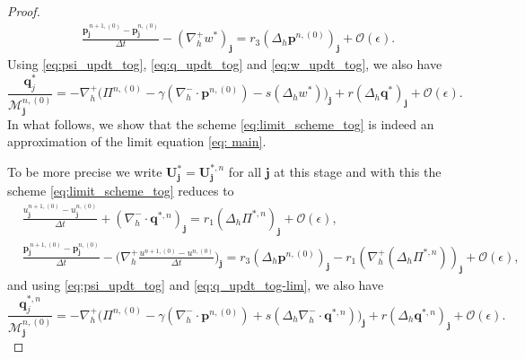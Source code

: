 \documentclass[11pt]{article}
\numberwithin{equation}{section}
\newtheorem{counter example}[theorem]{Counter Example}
\numberwithin{equation}{section}
\numberwithin{equation}{section}
\begin{document}
\begin{proof}
\begin{subequations}
\begin{align}
&\frac{\mathbf{p}_{\mathbf{j}}^{\,n+1,(0)} - \mathbf{p}_{\mathbf{j}}^{n,(0)}}{\Delta t} - (\nabla_h^+ w^{*})_{\mathbf{j}}= r_3(\Delta_h \mathbf{p}^{n,(0)})_{\mathbf{j}}+\mathcal{O}(\epsilon).\label{eq:p_updt_tog}
\end{align}
\end{subequations}
Using \eqref{eq:psi_updt_tog}, \eqref{eq:q_updt_tog} and \eqref{eq:w_updt_tog}, we also have
\begin{equation}
\label{eq:q_updt_tog-lim}
\frac{\mathbf{q}_{j}^{*}}{\mathcal{M}_{\mathbf{j}}^{n,(0)}}= 
-\nabla_h^+ \bigl(\Pi^{n,(0)}-\gamma(\nabla_h^- \cdot \mathbf{p}^{n,(0)})
-s(\Delta_{h}w^{*})\bigr)_{\mathbf{j}}+r(\Delta_{h} \mathbf{q}^{*})_{\mathbf{j}}+\mathcal{O}(\epsilon).
\end{equation}
In what follows, we show that the scheme \eqref{eq:limit_scheme_tog} is indeed an approximation of the limit equation \eqref{eq: main}.

To be more precise we write $\mathbf{U}^*_\mathbf{j}=\mathbf{U}^{*,n}_\mathbf{j}$ for all $\mathbf{j}$ at this stage and with this the scheme \eqref{eq:limit_scheme_tog} reduces to
\begin{subequations}
\label{eq:limit_scheme_tog1}
\begin{align}
&\frac{u_{\mathbf{j}}^{n+1,(0)} - u_{\mathbf{j}}^{n,(0)}}{\Delta t} + (\nabla_h^- \cdot\mathbf{q}^{*,n})_{\mathbf{j}} = r_1(\Delta_{h} \Pi^{*,n})_{\mathbf{j}}+\mathcal{O}(\epsilon),\label{eq:h_updt_tog1}\\
&\frac{\mathbf{p}_{\mathbf{j}}^{\,n+1,(0)} - \mathbf{p}_{\mathbf{j}}^{n,(0)}}{\Delta t} - \bigg(\nabla_h^+ \frac{u^{n+1,(0)} - u^{n,(0)}}{\Delta t}\bigg)_{\mathbf{j}}= r_3(\Delta_h \mathbf{p}^{n,(0)})_{\mathbf{j}}-r_1(\nabla_h^+(\Delta_{h} \Pi^{*,n}))_{\mathbf{j}}+\mathcal{O}(\epsilon),\label{eq:p_updt_tog1}
\end{align}
\end{subequations}
and using \eqref{eq:psi_updt_tog} and \eqref{eq:q_updt_tog-lim}, we also have
\begin{equation}
\label{eq:q_updt_tog-lim1}
\frac{\mathbf{q}_{j}^{{*},n}}{\mathcal{M}_{\mathbf{j}}^{n,(0)}}= 
-\nabla_h^+ \bigl(\Pi^{n,(0)}-\gamma(\nabla_h^- \cdot \mathbf{p}^{n,(0)})
+s(\Delta_{h}\nabla_h^- \cdot \mathbf{q}^{*,n})\bigr)_{\mathbf{j}}+r(\Delta_{h} \mathbf{q}^{*,n})_{\mathbf{j}}+\mathcal{O}(\epsilon).
\end{equation}


\end{proof}
\end{document}

